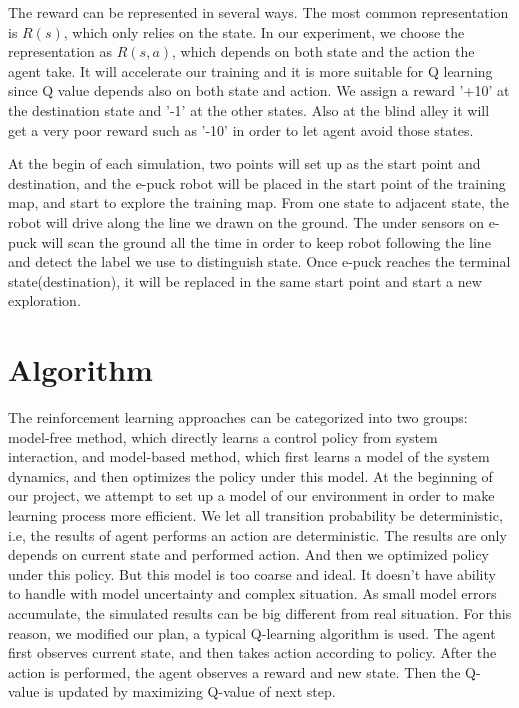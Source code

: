 \documentclass[a4paper, 11pt]{article} %
\begin{document}
The reward can be represented in several ways. The most common representation is $R(s)$, which only relies on the state. In our experiment, we choose the representation as $R(s,a)$, which depends on both state and the action the agent take. It will accelerate our training and it is more suitable for Q learning since Q value depends also on both state and action. We assign a reward '+10' at the destination
state and '-1' at the other states. Also at the blind alley it will get a very poor
reward such as '-10' in order to let agent avoid those states. 

At the begin of
each simulation, two points will set up as the start point and destination,
and the e-puck robot will be placed in the start point of the training map, and
start to explore the training map. From one state to adjacent state, the robot will
drive along the line we drawn on the ground. The under sensors on e-puck
will scan the ground all the time in order to keep robot following the line
and detect the label we use to distinguish state. Once e-puck reaches the terminal
state(destination), it will be replaced in the same start point and start a new exploration.

\section{Algorithm}
The reinforcement learning approaches can be categorized into two groups: model-free
method, which directly learns a control policy from system interaction, and
model-based method, which first learns a model of the system dynamics, and then
optimizes the policy under this model. At the beginning of our project, we attempt to
set up a model of our environment in order to make learning process more efficient.
We let all transition probability be deterministic, i.e, the results of agent performs
an action are deterministic. The results are only depends on current state and performed
action. And then we optimized policy under this policy. But this model is too coarse
and ideal. It doesn't have ability to handle with model uncertainty and complex situation.
As small model errors accumulate, the simulated results can be big different from
real situation. For this reason, we modified our plan, a typical Q-learning algorithm
is used. The agent first observes current state, and then takes action according to
policy. After the action is performed, the agent observes a reward and new state.
Then the Q-value is updated by maximizing Q-value of next step.
\end{document}
